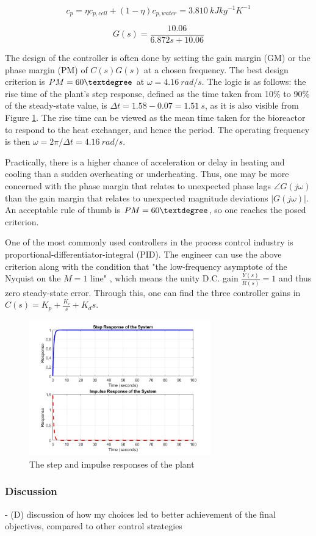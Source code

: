 \vspace{-5mm}
\begin{equation}
    c_p = \eta c_{p, cell} + (1-\eta) c_{p, water} = 3.810 \ kJ kg^{-1} K^{-1}
    \label{equation:E-temp-5}
\end{equation}

\vspace{-10mm}
\begin{equation}
    G(s) = \frac{10.06}{6.872 s + 10.06}
    \label{equation:E-temp-6}
\end{equation}

The design of the controller is often done by setting the gain margin (GM) or the phase margin (PM) of $C(s)G(s)$ at a chosen frequency. The best design criterion is $PM = 60 \textdegree$ at $\omega = 4.16 \ rad/s$. The logic is as follows: the rise time of the plant's step response, defined as the time taken from 10\% to 90\% of the steady-state value, is $\Delta t = 1.58 - 0.07 = 1.51 \ s$, as it is also visible from Figure \ref{figure:E-1-4-step-and-impulse}. The rise time can be viewed as the mean time taken for the bioreactor to respond to the heat exchanger, and hence the period. The operating frequency is then $\omega = 2\pi / \Delta t = 4.16 \ rad/s$.

Practically, there is a higher chance of acceleration or delay in heating and cooling than a sudden overheating or underheating. Thus, one may be more concerned with the phase margin that relates to unexpected phase lags $\angle G(j \omega)$ than the gain margin that relates to unexpected magnitude deviations $|G(j \omega)|$. An acceptable rule of thumb is $PM = 60 \textdegree$, so one reaches the posed criterion.

One of the most commonly used controllers in the process control industry is proportional-differentiator-integral (PID). The engineer can use the above criterion along with the condition that "the low-frequency asymptote of the Nyquist on the $M=1$ line" \cite{E-Cannon2022-2}, which means the unity D.C. gain $\frac{Y(s)}{R(s)} = 1$ and thus zero steady-state error. Through this, one can find the three controller gains in $C(s) = K_p + \frac{K_i}{s} + K_d s$.

\begin{figure}[h]
    \centering
    \includegraphics[width=0.7\textwidth]{E-1-4-step-and-impulse.jpg}
    \hfill
    \caption{The step and impulse responses of the plant}
    \label{figure:E-1-4-step-and-impulse}
\end{figure}

\vspace{-10mm}
\subsubsection{Discussion}
- (D) discussion of how my choices led to better achievement of the final objectives, compared to other control strategies